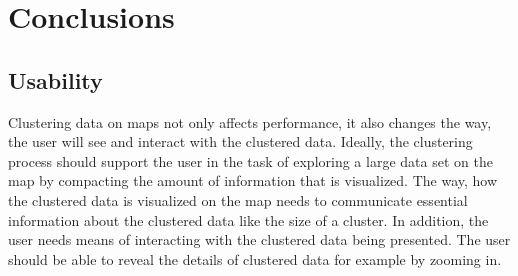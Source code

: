 
%
%

\chapter{Conclusions}
\label{chapter:conclusions}

\section{Usability}
\label{chapter:objective-usability}

Clustering data on maps not only affects performance, it also changes the way, the user will see and interact with the clustered data. Ideally, the clustering process should support the user in the task of exploring a large data set on the map by compacting the amount of information that is visualized. The way, how the clustered data is visualized on the map needs to communicate essential information about the clustered data like the size of a cluster. In addition, the user needs means of interacting with the clustered data being presented. The user should be able to reveal the details of clustered data for example by zooming in. 







